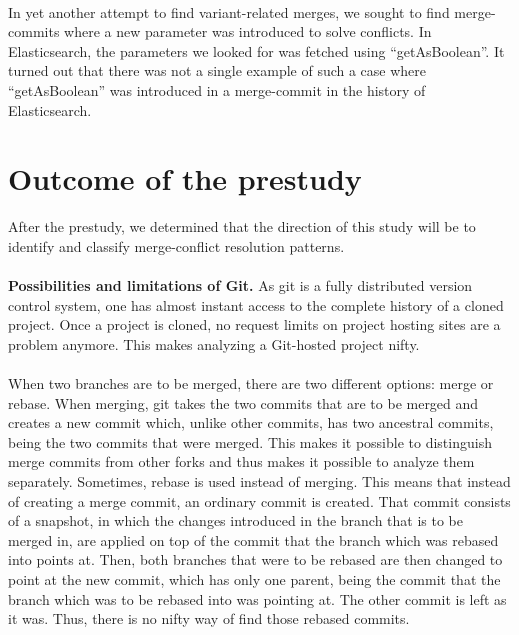 \paragraph*{}
In yet another attempt to find variant-related merges, we sought to find merge-commits where a new parameter was introduced to solve conflicts. In Elasticsearch, the parameters we looked for was fetched using “getAsBoolean”. It turned out that there was not a single example of such a case where “getAsBoolean” was introduced in a merge-commit in the history of Elasticsearch.
\section{Outcome of the prestudy}
After the prestudy, we determined that the direction of this study will be to identify and classify merge-conflict resolution patterns.
\paragraph*{}
\textbf{Possibilities and limitations of Git.} As git is a fully distributed version control system, one has almost instant access to the complete history of a cloned project. Once a project is cloned, no request limits on project hosting sites are a problem anymore. This makes analyzing a Git-hosted project nifty.
\paragraph*{}
When two branches are to be merged, there are two different options: merge or rebase. When merging, git takes the two commits that are to be merged and creates a new commit which, unlike other commits, has two ancestral commits, being the two commits that were merged. This makes it possible to distinguish merge commits from other forks and thus makes it possible to analyze them separately. Sometimes, rebase is used instead of merging. This means that instead of creating a merge commit, an ordinary commit is created. That commit consists of a snapshot, in which the changes introduced in the branch that is to be merged in, are applied on top of the commit that the branch which was rebased into points at. Then, both branches that were to be rebased are then changed to point at the new commit, which has only one parent, being the commit that the branch which was to be rebased into was pointing at. The other commit is left as it was. Thus, there is no nifty way of find those rebased commits.

